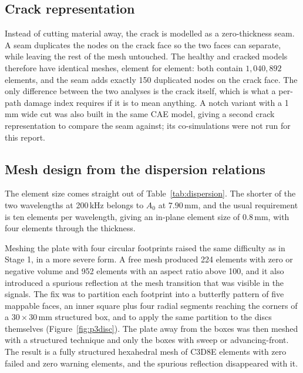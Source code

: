 \subsection{Crack representation}

Instead of cutting material away, the crack is modelled as a zero-thickness seam. A seam duplicates the nodes
on the crack face so the two faces can separate, while leaving the rest of the mesh untouched. The healthy and
cracked models therefore have identical meshes, element for element: both contain $1{,}040{,}892$ elements,
and the seam adds exactly 150 duplicated nodes on the crack face. The only difference between the two
analyses is the crack itself, which is what a per-path damage index requires if it is to mean anything. A notch
variant with a 1\,mm wide cut was also built in the same CAE model, giving a second crack representation to
compare the seam against; its co-simulations were not run for this report.

\subsection{Mesh design from the dispersion relations}

The element size comes straight out of Table~\ref{tab:dispersion}. The shorter of the two wavelengths at
200\,kHz belongs to $A_{0}$ at $7.90$\,mm, and the usual requirement is ten elements per wavelength, giving
an in-plane element size of $0.8$\,mm, with four elements through the thickness.

Meshing the plate with four circular footprints raised the same difficulty as in Stage 1, in a more severe
form. A free mesh produced 224 elements with zero or negative volume and 952 elements with an aspect ratio
above 100, and it also introduced a spurious reflection at the mesh transition that was visible in the signals.
The fix was to partition each footprint into a butterfly pattern of five mappable faces, an inner square plus
four radial segments reaching the corners of a $30\times30$\,mm structured box, and to apply the same
partition to the discs themselves (Figure~\ref{fig:p3disc}). The plate away from the boxes was then meshed
with a structured technique and only the boxes with sweep or advancing-front. The result is a fully
structured hexahedral mesh of C3D8E elements with zero failed and zero warning elements, and the spurious
reflection disappeared with it.


